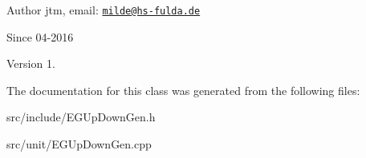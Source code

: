 \begin{DoxyAuthor}{Author}
jtm, email\-:  \href{mailto:milde@hs-fulda.de}{\tt milde@hs-\/fulda.\-de} 
\end{DoxyAuthor}
\begin{DoxySince}{Since}
04-\/2016 
\end{DoxySince}
\begin{DoxyVersion}{Version}
1. 
\end{DoxyVersion}


The documentation for this class was generated from the following files\-:\begin{DoxyCompactItemize}
\item 
src/include/E\-G\-Up\-Down\-Gen.\-h\item 
src/unit/E\-G\-Up\-Down\-Gen.\-cpp\end{DoxyCompactItemize}
